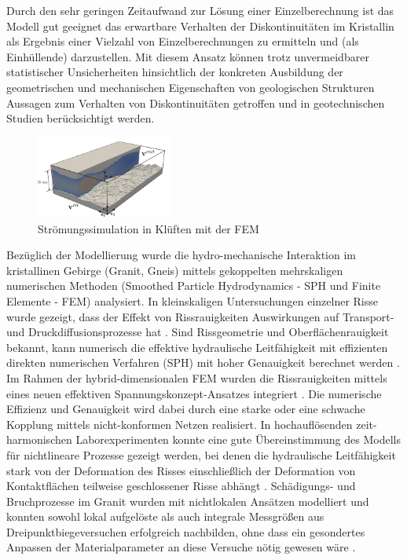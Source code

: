 Durch den sehr geringen Zeitaufwand zur Lösung einer Einzelberechnung ist das Modell gut geeignet das erwartbare Verhalten der Diskontinuitäten im Kristallin als Ergebnis einer Vielzahl von Einzelberechnungen zu ermitteln und (als Einhüllende) darzustellen. 
Mit diesem Ansatz können trotz unvermeidbarer statistischer Unsicherheiten hinsichtlich der konkreten Ausbildung der geometrischen und mechanischen Eigenschaften von geologischen Strukturen Aussagen zum Verhalten von Diskontinuitäten getroffen und in geotechnischen Studien berücksichtigt werden.

\begin{figure}
\vspace{-5mm}
\includegraphics[width=0.4\textwidth]{figures/geomint-me08-01.png}
\caption{Strömungssimulation in Klüften mit der FEM \cite{steeb-2020c}}
\label{fig:wp3-results}
\end{figure}
%
Bezüglich der Modellierung wurde die hydro-mechanische Interaktion im kristallinen Gebirge (Granit, Gneis) mittels gekoppelten mehrskaligen numerischen Methoden (Smoothed Particle Hydrodynamics - SPH und Finite Elemente - FEM) analysiert. In kleinskaligen Untersuchungen einzelner Risse wurde gezeigt, dass der Effekt von Rissrauigkeiten Auswirkungen auf Transport- und Druckdiffusionsprozesse hat \cite{steeb-2019b}. Sind Rissgeometrie und Oberflächenrauigkeit bekannt, kann numerisch die effektive hydraulische Leitfähigkeit mit effizienten direkten numerischen Verfahren (SPH) mit hoher Genauigkeit berechnet werden \cite{steeb-2019b}. Im Rahmen der hybrid-dimensionalen FEM wurden die Rissrauigkeiten mittels eines neuen effektiven Spannungskonzept-Ansatzes integriert \cite{schmidt2019}.
Die numerische Effizienz und Genauigkeit wird dabei durch eine starke oder eine schwache Kopplung mittels nicht-konformen Netzen realisiert.
%
In hochauflösenden zeit-harmonischen Laborexperimenten konnte eine gute Übereinstimmung des Modells für nichtlineare Prozesse gezeigt werden, bei denen die hydraulische Leitfähigkeit stark von der Deformation des Risses einschlie{\ss}lich der Deformation von Kontaktflächen teilweise geschlossener Risse abhängt \cite{steeb-2020a}.
%
Schädigungs- und Bruchprozesse im Granit wurden mit nichtlokalen Ansätzen modelliert und konnten sowohl lokal aufgelöste als auch integrale Messgrö{\ss}en aus Dreipunktbiegeversuchen erfolgreich nachbilden, ohne dass ein gesondertes Anpassen der Materialparameter an diese Versuche nötig gewesen wäre \cite{Parisio2019102}.

